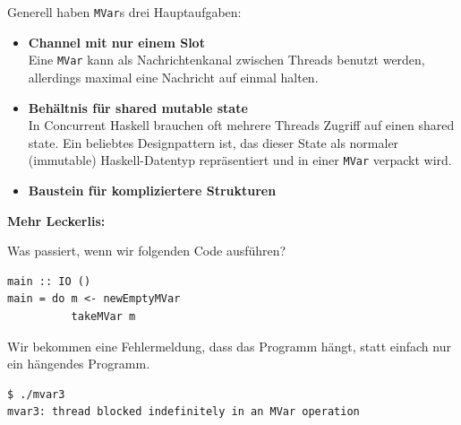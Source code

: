 \documentclass{beamer}
\begin{document}

\begin{frame}
Generell haben \texttt{MVar}s drei Hauptaufgaben:\pause

\begin{itemize}
\item \textbf{Channel mit nur einem Slot}\\
Eine \texttt{MVar} kann als Nachrichtenkanal zwischen Threads benutzt werden, allerdings maximal eine Nachricht auf einmal halten.\pause

\item \textbf{Behältnis für shared mutable state}\\
In Concurrent Haskell brauchen oft mehrere Threads Zugriff auf einen shared state. Ein beliebtes Designpattern ist, das dieser State als normaler (immutable) Haskell-Datentyp repräsentiert und in einer \texttt{MVar} verpackt wird.\pause

\item \textbf{Baustein für kompliziertere Strukturen}
\end{itemize}
\end{frame}


\begin{frame}[fragile]

\textbf{Mehr Leckerlis:}\smallskip\smallskip

Was passiert, wenn wir folgenden Code ausführen?

\begin{verbatim}
main :: IO ()
main = do m <- newEmptyMVar
          takeMVar m
\end{verbatim}
\pause
\bigskip

Wir bekommen eine Fehlermeldung, dass das Programm hängt, statt einfach nur ein hängendes Programm.

\begin{verbatim}
$ ./mvar3
mvar3: thread blocked indefinitely in an MVar operation
\end{verbatim}
\end{frame}

\end{document}
